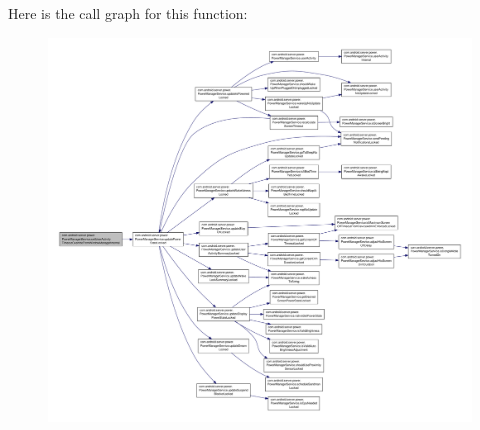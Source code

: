 Here is the call graph for this function\-:
\nopagebreak
\begin{figure}[H]
\begin{center}
\leavevmode
\includegraphics[width=350pt]{classcom_1_1android_1_1server_1_1power_1_1PowerManagerService_a59dc79c24455a865c24038ccc4ef6d40_cgraph}
\end{center}
\end{figure}


